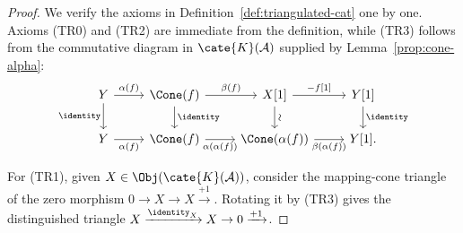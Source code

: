 \begin{proof}
	We verify the axioms in Definition~\ref{def:triangulated-cat} one by one.
	Axioms (TR0) and (TR2) are immediate from the definition, while (TR3)
	follows from the commutative diagram in $\cate{K}(\mathcal{A})$ supplied
	by Lemma~\ref{prop:cone-alpha}:
	\[\begin{tikzcd}
		Y \arrow[r, "{\alpha(f)}"] \arrow[d, "\identity"'] & \Cone(f) \arrow[r, "{\beta(f)}"] \arrow[d, "\identity"] & X[1] \arrow[r, "{-f[1]}"] \arrow[d, "\sim" sloped] & Y[1] \arrow[d, "\identity"] \\
		Y \arrow[r, "{\alpha(f)}"'] & \Cone(f) \arrow[r, "{\alpha(\alpha(f))}"'] & \Cone(\alpha(f)) \arrow[r, "{\beta(\alpha(f))}"'] & Y[1] .
	\end{tikzcd}\]

	For (TR1), given $X \in \Obj(\cate{K}(\mathcal{A}))$, consider the
	mapping-cone triangle of the zero morphism
	$0 \to X \to X \xrightarrow{+1}$. Rotating it by (TR3) gives the
	distinguished triangle
	$X \xrightarrow{\identity_X} X \to 0 \xrightarrow{+1}$.


\end{proof}
